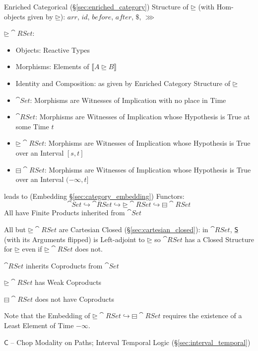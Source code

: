 Enriched Categorical (\S\ref{sec:enriched_category}) Structure of
$\unrhd$ (with Hom-objects given by $\unrhd$): $arr$, $id$, $before$,
$after$, $\$$, $\ggg$

$\unrhd \cat{RSet}$:
\begin{itemize}
  \item Objects: Reactive Types
  \item Morphisms: Elements of $\llbracket A \unrhd B
    \rrbracket$
  \item Identity and Composition: as given by Enriched Category
    Structure of $\unrhd$
\end{itemize}

\begin{itemize}
  \item $\cat{Set}$: Morphisms are Witnesses of Implication with no
    place in Time
  \item $\cat{RSet}$: Morphisms are Witnesses of Implication whose
    Hypothesis is True at some Time $t$
  \item $\unrhd \cat{RSet}$: Morphisms are Witnesses of Implication
    whose Hypothesis is True over an Interval $[s,t]$
  \item $\boxminus \cat{RSet}$: Morphisms are Witnesses of Implication
    whose Hypothesis is True over an Interval $(-\infty,t]$
\end{itemize}
leads to (Embedding \S\ref{sec:category_embedding}) Functors:
\[
  \cat{Set} \hookrightarrow \cat{RSet} \hookrightarrow
    \unrhd\cat{RSet} \hookrightarrow \boxminus\cat{RSet}
\]
All have Finite Products inherited from $\cat{Set}$

All but $\unrhd\cat{RSet}$ are Cartesian Closed
(\S\ref{sec:cartesian_closed}): in $\cat{RSet}$, $\underline{\mathsf{S}}$
(with its Arguments flipped) is Left-adjoint to $\unrhd$ so
$\cat{RSet}$ has a Closed Structure for $\unrhd$ even if
$\unrhd\cat{RSet}$ does not.


$\cat{RSet}$ inherits Coproducts from $\cat{Set}$

$\unrhd\cat{RSet}$ has Weak Coproducts

$\boxminus\cat{RSet}$ does not have Coproducts

\fist Note that the Embedding of $\unrhd\cat{RSet} \hookrightarrow
\boxminus\cat{RSet}$ requires the existence of a Least Element of Time
$-\infty$.

$\mathsf{C}$ -- Chop Modality on Paths; Interval Temporal Logic
(\S\ref{sec:interval_temporal})


\asterism


